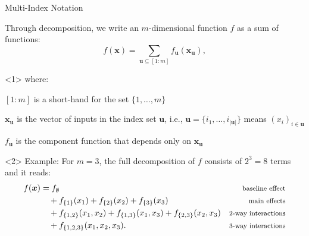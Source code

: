 \documentclass[english,aspectratio=169]{beamer}
\let\tempone\itemize
\let\temptwo\enditemize
\renewenvironment{itemize}{\tempone\addtolength{\itemsep}{0.35\baselineskip}}{\temptwo}
\renewcommand{\emph}[1]{\textcolor[HTML]{006d2c}{\fontseries{sb}\selectfont #1}}
\begin{document}
\begin{frame}[fragile]{Multi-Index Notation}
\small

Through decomposition, we write an $m$-dimensional function $f$ as a sum of functions:
\begin{equation*}
  f(\bm{x}) = \sum_{\bm{u} \subseteq [1: m]} f_{\bm{u}} (\bm{x}_{\bm{u}}),
\end{equation*}
\begin{onlyenv}<1>
  where:
  \vspace{1.0em}
  \begin{itemize}
    \item $[1:m]$ is a short-hand for the set $\{ 1, \ldots, m\}$
    \item $\bm{x}_{\bm{u}}$ is the vector of inputs in the index set $\bm{u}$,
          i.e., $\bm{u} = \{ i_1, \ldots, i_{\lvert \bm{u} \rvert} \}$ means
          $(x_i)_{i \in \bm{u}}$
    \item $f_{\bm{u}}$ is the component function that depends only on $\bm{x}_{\bm{u}}$
  \end{itemize}

\end{onlyenv}

\begin{onlyenv}<2>
  \emph{Example}: For $m = 3$, the full decomposition of $f$ consists of $2^3 = 8$ terms and it reads:
  \begin{align*}
    f(\bm{x}) & = f_\emptyset & \text{\footnotesize baseline effect} \\
              &\quad + f_{\{1\}} (x_1) + f_{\{2\}} (x_2) + f_{\{3\}} (x_3) & \text{\footnotesize main effects} \\
              &\quad + f_{\{1, 2\}} (x_1, x_2) + f_{\{1, 3\}} (x_1, x_3) + f_{\{2, 3\}} (x_2, x_3) & \text{\footnotesize $2$-way interactions} \\
              &\quad + f_{\{1, 2, 3\}} (x_1, x_2, x_3). & \text{\footnotesize $3$-way interactions}
  \end{align*}
\end{onlyenv}

\end{frame}
\end{document}
